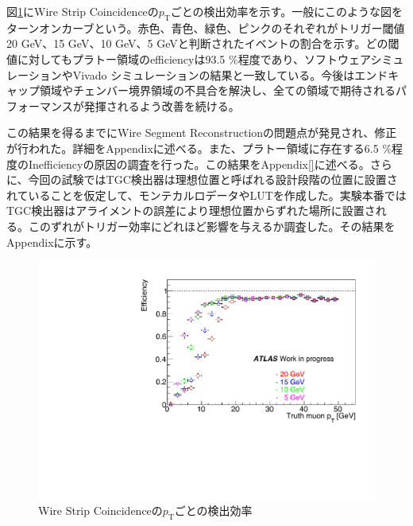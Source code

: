 図\ref{SM_A_WS_turnon}にWire Strip Coincidenceの$p_\mathrm{T}$ごとの検出効率を示す。一般にこのような図をターンオンカーブという。赤色、青色、緑色、ピンクのそれぞれがトリガー閾値20 GeV、15 GeV、10 GeV、5 GeVと判断されたイベントの割合を示す。どの\pt 閾値に対してもプラトー領域のefficiencyは93.5 \%程度であり、ソフトウェアシミュレーションやVivado シミュレーションの結果と一致している。今後はエンドキャップ領域やチェンバー境界領域の不具合を解決し、全ての領域で期待されるパフォーマンスが発揮されるよう改善を続ける。

この結果を得るまでにWire Segment Reconstructionの問題点が発見され、修正が行われた。詳細をAppendix{}に述べる。また、プラトー領域に存在する6.5 \%程度のInefficiencyの原因の調査を行った。この結果をAppendix\ref{}に述べる。さらに、今回の試験ではTGC検出器は理想位置と呼ばれる設計段階の位置に設置されていることを仮定して、モンテカルロデータやLUTを作成した。実験本番ではTGC検出器はアライメントの誤差により理想位置からずれた場所に設置される。このずれがトリガー効率にどれほど影響を与えるか調査した。その結果をAppendix{}に示す。

\begin{figure} 
\centering
\includegraphics[width=16cm]{fig/Test/A_SM_ws_turnon.pdf}
\caption[]{Wire Strip Coincidenceの$p_\mathrm{T}$ごとの検出効率}
\label{SM_A_WS_turnon}
\end{figure}




